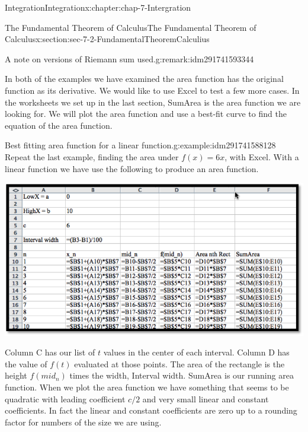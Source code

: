 \documentclass[oneside,10pt,]{book}
\numberwithin{equation}{section}
\begin{document}
\begin{chapterptx}{Integration}{}{Integration}{}{}{x:chapter:chap-7-Intergration}
\begin{sectionptx}{The Fundamental Theorem of Calculus}{}{The Fundamental Theorem of Calculus}{}{}{x:section:sec-7-2-FundamentalTheoremCalculius}
\begin{remark}{A note on versions of Riemann sum used.}{g:remark:idm291741593344}
\end{remark}
In both of the examples we have examined the area function has the original function as its derivative.  We would like to use Excel to test a few more cases. In the worksheets we set up in the last section, SumArea is the area function we are looking for.  We will plot the area function and use a best-fit curve to find the equation of the area function.%
\begin{example}{Best fitting area function for a linear function.}{g:example:idm291741588128}%
Repeat the last example, finding the area under \(f(x)=6x\), with Excel.  With a linear function we have use the following to produce an area function.%
\begin{sidebyside}{1}{0.05}{0.05}{0}%
\begin{sbspanel}{0.9}%
\includegraphics[width=\linewidth]{images/sec7-2-4.png}
\end{sbspanel}%
\end{sidebyside}%
\par
Column C has our list of \(t\) values in the center of each interval.  Column D has the value of \(f(t)\) evaluated at those points.  The area of the rectangle is the height \(f(mid_n)\) times the width, Interval width.  SumArea is our running area function.  When we plot the area function we have something that seems to be quadratic with leading coefficient \(c/2\) and very small linear and constant coefficients.  In fact the linear and constant coefficients are zero up to a rounding factor for numbers of the size we are using.%
\begin{sidebyside}{1}{0.1}{0.1}{0}%
\begin{sbspanel}{0.8}%

\end{sbspanel}
\end{sidebyside}
\end{example}
\end{sectionptx}
\end{chapterptx}
\end{document}
